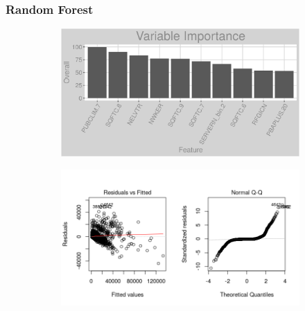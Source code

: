 \subsubsection{Random Forest}
\label{appendix:electricity:rf}
\begin{figure}[h]
\centering
\begin{subfigure}{1\textwidth}
\centering
\includegraphics[width=.99\textwidth, height=0.3\textheight]{Images/electricity_rf_vars.png}
\end{subfigure}
\begin{subfigure}{1\textwidth}
\centering
\includegraphics[width=.99\textwidth, height=0.475\textheight]{Images/electricity_rf_res_1.png}
\end{subfigure}
\end{figure}
\FloatBarrier
\newpage
